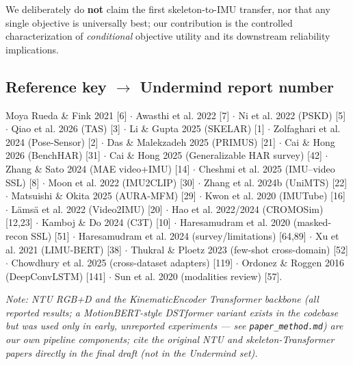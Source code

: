 We deliberately do \textbf{not} claim the first skeleton-to-IMU transfer, nor that any single objective is universally best; our contribution is the controlled characterization of \textit{conditional} objective utility and its downstream reliability implications.

\subsection{Reference key $\rightarrow$ Undermind report number}

Moya Rueda \& Fink 2021 [6] $\cdot$ Awasthi et al. 2022 [7] $\cdot$ Ni et al. 2022 (PSKD) [5] $\cdot$ Qiao et al. 2026 (TAS) [3] $\cdot$ Li \& Gupta 2025 (SKELAR) [1] $\cdot$ Zolfaghari et al. 2024 (Pose-Sensor) [2] $\cdot$ Das \& Malekzadeh 2025 (PRIMUS) [21] $\cdot$ Cai \& Hong 2026 (BenchHAR) [31] $\cdot$ Cai \& Hong 2025 (Generalizable HAR survey) [42] $\cdot$ Zhang \& Sato 2024 (MAE video+IMU) [14] $\cdot$ Cheshmi et al. 2025 (IMU--video SSL) [8] $\cdot$ Moon et al. 2022 (IMU2CLIP) [30] $\cdot$ Zhang et al. 2024b (UniMTS) [22] $\cdot$ Matsuishi \& Okita 2025 (AURA-MFM) [29] $\cdot$ Kwon et al. 2020 (IMUTube) [16] $\cdot$ Lämsä et al. 2022 (Video2IMU) [20] $\cdot$ Hao et al. 2022/2024 (CROMOSim) [12,23] $\cdot$ Kamboj \& Do 2024 (C3T) [10] $\cdot$ Haresamudram et al. 2020 (masked-recon SSL) [51] $\cdot$ Haresamudram et al. 2024 (survey/limitations) [64,89] $\cdot$ Xu et al. 2021 (LIMU-BERT) [38] $\cdot$ Thukral \& Ploetz 2023 (few-shot cross-domain) [52] $\cdot$ Chowdhury et al. 2025 (cross-dataset adapters) [119] $\cdot$ Ordonez \& Roggen 2016 (DeepConvLSTM) [141] $\cdot$ Sun et al. 2020 (modalities review) [57].

\textit{Note: NTU RGB+D and the KinematicEncoder Transformer backbone (all reported results; a MotionBERT-style DSTformer variant exists in the codebase but was used only in early, unreported experiments --- see \texttt{paper\_method.md}) are our own pipeline components; cite the original NTU and skeleton-Transformer papers directly in the final draft (not in the Undermind set).}
